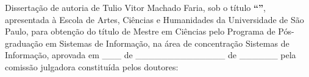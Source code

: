 \documentclass[
	12pt,				%
	oneside,			%
	a4paper,			%
	english,			%
	brazil				%
	]{abntex2ppgsi}
\begin{document}

\begin{folhadeaprovacao}
%
%
%
%
\noindent Dissertação de autoria de Tulio Vitor Machado Faria, sob o título \textbf{``\imprimirtitulo''}, apresentada à Escola de Artes, Ciências e Humanidades da Universidade de São Paulo, para obtenção do título de Mestre em Ciências pelo Programa de Pós-graduação em Sistemas de Informação, na área de concentração Sistemas de Informação, aprovada em \_\_\_ de \_\_\_\_\_\_\_\_\_\_\_\_\_\_ de \_\_\_\_\_\_ pela comissão julgadora constituída pelos doutores:

\vspace*{3cm}


\end{folhadeaprovacao}
\end{document}
